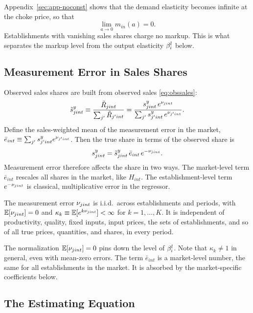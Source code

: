 Appendix~\ref{sec:app-noconst} shows that the demand elasticity becomes infinite at the choke price, so that
\begin{equation}\label{eq:noconst}
	\lim_{a \to 0} m_{in}(a) = 0.
\end{equation}
Establishments with vanishing sales shares charge no markup.
This is what separates the markup level from the output elasticity $\beta^l_i$ below.

\subsection{Measurement Error in Sales Shares}\label{sec:mesales}

Observed sales shares are built from observed sales \eqref{eq:obssales}:
\begin{equation*}
	\tilde{s}^y_{jint} \equiv \frac{\tilde{R}_{jint}}{\sum_{j'} \tilde{R}_{j'int}} = \frac{s^y_{jint} \, e^{\nu_{jint}}}{\sum_{j'} s^y_{j'int} \, e^{\nu_{j'int}}}.
\end{equation*}
Define the sales-weighted mean of the measurement error in the market, $\bar{e}_{int} \equiv \sum_{j'} s^y_{j'int} e^{\nu_{j'int}}$.
Then the true share in terms of the observed share is
\begin{equation}\label{eq:sharetrue}
	s^y_{jint} = \tilde{s}^y_{jint} \, \bar{e}_{int} \, e^{-\nu_{jint}}.
\end{equation}
Measurement error therefore affects the share in two ways.
The market-level term $\bar{e}_{int}$ rescales all shares in the market, like $H_{int}$.
The establishment-level term $e^{-\nu_{jint}}$ is classical, multiplicative error in the regressor.

\label{assum:me}
The measurement error $\nu_{jint}$ is i.i.d.\ across establishments and periods, with $\mathbb{E}[\nu_{jint}] = 0$ and $\kappa_k \equiv \mathbb{E}[e^{k \nu_{jint}}] < \infty$ for $k = 1, \dots, K$.
It is independent of productivity, quality, fixed inputs, input prices, the sets of establishments, and so of all true prices, quantities, and shares, in every period.
\eassu

The normalization $\mathbb{E}[\nu_{jint}] = 0$ pins down the level of $\beta^l_i$.
Note that $\kappa_k \neq 1$ in general, even with mean-zero errors.
The term $\bar{e}_{int}$ is a market-level number, the same for all establishments in the market.
It is absorbed by the market-specific coefficients below.

\subsection{The Estimating Equation}\label{sec:estequation}

